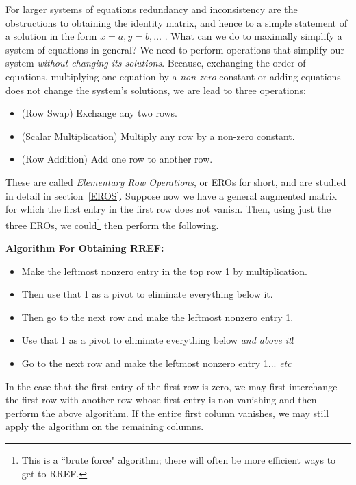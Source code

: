 For larger systems of equations redundancy and inconsistency are the obstructions to obtaining the identity matrix, and hence to a simple statement of a solution in the form $x=a,y=b,\ldots$ . 
What can we do to maximally simplify a system of equations in general?
We need to perform operations that simplify our system {\itshape without changing its solutions}.
Because, exchanging the order of equations, multiplying one equation by a {\itshape non-zero} constant or adding equations does not 
change the system's solutions, we are lead to three operations:
\begin{itemize}
\item (Row Swap) Exchange any two rows.
\item (Scalar Multiplication) Multiply any row by a non-zero constant.
\item (Row Addition) Add 
one row to another row.
\end{itemize}
These are called \emph{Elementary Row Operations}, or EROs for short, and are studied in detail in section~\ref{EROS}. 
Suppose now we have a general augmented matrix for which the first entry in the first row does not vanish. 
Then, using just the three EROs, we could\footnote{This is a ``brute force" algorithm;  there will often be more efficient ways to get to RREF.} then perform the following.\\

\newpage
\begin{center}
{\bf {\Large Algorithm For Obtaining RREF:}}
\end{center}
\begin{itemize}
\item Make the leftmost nonzero entry in the top row 1 by multiplication.  
\item Then use that 1 as a pivot to eliminate everything below it. 
\item Then go to the next row and make the leftmost nonzero entry 1. 
\item Use that 1 as a pivot to eliminate everything below {\itshape and above it}! 
\item Go to the next row and make the leftmost nonzero entry 1... {\itshape etc}
\end{itemize}
In the case that the first entry of the first row is zero, we may first interchange the first row with another row whose first entry is non-vanishing  and then perform the above algorithm. If the entire first column vanishes, we may still apply the algorithm on the remaining columns.


